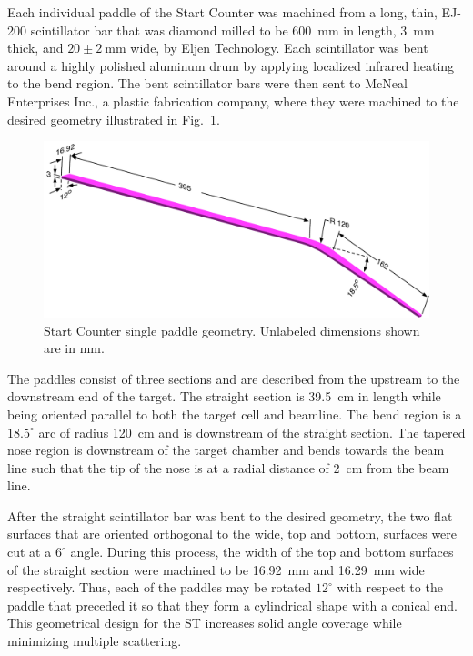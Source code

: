 Each individual paddle of the Start Counter was machined from a long, thin,  EJ-200 scintillator bar that was diamond milled to be 600~mm in length, 3~mm thick, and $\mathrm{20 \pm 2\ mm}$ wide, by Eljen Technology.  Each scintillator was bent around a highly polished aluminum drum by applying localized infrared heating to the bend region.  The bent scintillator bars were then sent to McNeal Enterprises Inc.\cite{mcneal}, a plastic fabrication company, where they were machined to the desired geometry illustrated in Fig.~\ref{fig:stpaddleiso}.
	\begin{figure}[!htb]
		\centering
		\includegraphics[width=1.0\columnwidth]{design/figs/scintillator.pdf}
		\caption{Start Counter single paddle geometry. Unlabeled dimensions shown are in mm.}
		\label{fig:stpaddleiso}
	\end{figure}

The paddles consist of three sections and are described from the upstream to the downstream end of the target.  The straight section is 39.5~cm in length while being oriented parallel to both the target cell and beamline.  The bend region is a $18.5^{\circ}$ arc of radius 120~cm and is downstream of the straight section. The tapered nose region is downstream of the target chamber and bends towards the beam line such that the tip of the nose is at a radial distance of 2~cm from the beam line.  

After the straight scintillator bar was bent to the desired geometry, the two flat surfaces that are oriented orthogonal to the wide, top and bottom, surfaces were cut at a $6^{\circ}$ angle.  During this process, the width of the top and bottom surfaces of the straight section were machined to be 16.92~mm and 16.29~mm wide respectively. Thus, each of the paddles may be rotated $12^{\circ}$ with respect to the paddle that preceded it so that they form a cylindrical shape with a conical end.  This geometrical design for the ST increases solid angle coverage while minimizing multiple scattering.  

